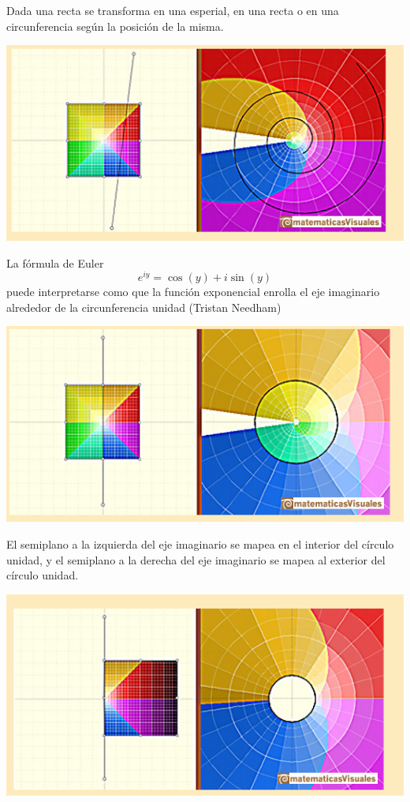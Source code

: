 \documentclass{apuntes}
\begin{document}
Dada una recta se transforma en una esperial, en una recta o en una circunferencia según la posición de la misma.
\begin{center}
\includegraphics[scale=0.75]{img/exp3.png}
\end{center}

La fórmula de Euler
\[e^{iy}=\cos(y)+i\sin(y)\]
puede interpretarse como que la función exponencial enrolla el eje imaginario alrededor de la circunferencia unidad (Tristan Needham)
\begin{center}
\includegraphics[scale=0.75]{img/exp4.png}
\end{center}

El semiplano a la izquierda del eje imaginario se mapea en el interior del círculo unidad, y el semiplano a la derecha del eje imaginario se mapea al exterior del círculo unidad.
\begin{center}
\includegraphics[scale=0.75]{img/exp5.png}
\end{center}
\end{document}
